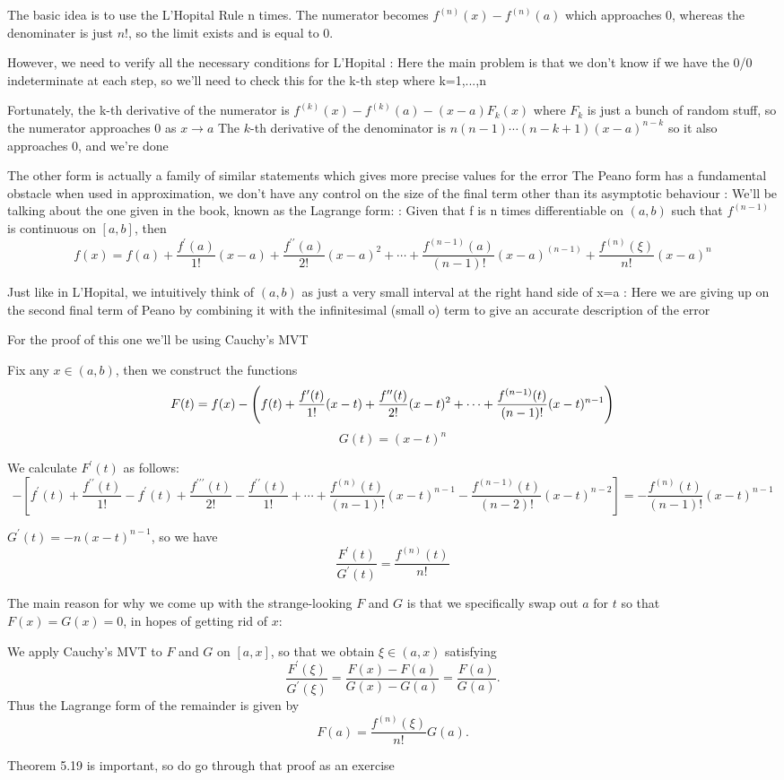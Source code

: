 The basic idea is to use the L'Hopital Rule n times. The numerator becomes $f^{(n)}(x)-f^{(n)}(a)$ which approaches $0$, whereas the denominater is just $n!$, so the limit exists and is equal to $0$.

However, we need to verify all the necessary conditions for L'Hopital
:
Here the main problem is that we don't know if we have the 0/0 indeterminate at each step, so we'll need to check this for the k-th step where k=1,...,n

Fortunately, the k-th derivative of the numerator is
$f^{(k)}(x)-f^{(k)}(a)-(x-a)F_k(x)$ where $F_k$ is just a bunch of random stuff, so the numerator approaches $0$ as $x\to a$
The $k$-th derivative of the denominator is $n(n-1)\cdots(n-k+1)(x-a)^{n-k}$ so it also approaches $0$, and we're done

The other form is actually a family of similar statements which gives more precise values for the error
The Peano form has a fundamental obstacle when used in approximation, we don't have any control on the size of the final term other than its asymptotic behaviour
:
We'll be talking about the one given in the book, known as the Lagrange form:
:
Given that f is n times differentiable on $(a,b)$ such that $f^{(n-1)}$ is continuous on $[a,b]$, then
\[ f(x)=f(a)+\frac{f^\prime(a)}{1!}(x-a)+\frac{f^{\prime\prime}(a)}{2!}(x-a)^2+\cdots+\frac{f^{(n-1)}(a)}{(n-1)!}(x-a)^(n-1)+\frac{f^{(n)}(\xi)}{n!}(x-a)^n \]

Just like in L'Hopital, we intuitively think of $(a,b)$ as just a very small interval at the right hand side of x=a
:
Here we are giving up on the second final term of Peano by combining it with the infinitesimal (small o) term to give an accurate description of the error

For the proof of this one we'll be using Cauchy's MVT

Fix any $x\in(a,b)$, then we construct the functions
\[ F(t)=f(x)-\left(f(t)+\frac{f^\prime(t)}{1!}(x-t)+\frac{f^{\prime\prime}(t)}{2!}(x-t)^2+\cdots+\frac{f^{(n-1)}(t)}{(n-1)!}(x-t)^{n-1}\right) \]
\[ G(t)=(x-t)^n \]

We calculate $F^\prime(t)$ as follows:
\[ -[f^\prime(t)+\frac{f^{\prime\prime}(t)}{1!}-f^\prime(t)+\frac{f^{\prime\prime\prime}(t)}{2!}-\frac{f^{\prime\prime}(t)}{1!}+\cdots+\frac{f^{(n)}(t)}{(n-1)!}(x-t)^{n-1}-\frac{f^{(n-1)}(t)}{(n-2)!}(x-t)^{n-2}]=-\frac{f^{(n)}(t)}{(n-1)!}(x-t)^{n-1} \]

$G^\prime(t)=-n(x-t)^{n-1}$, so we have
\[ \frac{F^\prime(t)}{G^\prime(t)}=\frac{f^{(n)}(t)}{n!} \]

The main reason for why we come up with the strange-looking $F$ and $G$ is that we specifically swap out $a$ for $t$ so that $F(x)=G(x)=0$, in hopes of getting rid of $x$:

We apply Cauchy's MVT to $F$ and $G$ on $[a,x]$, so that we obtain $\xi\in(a,x)$ satisfying
\[ \frac{F^\prime(\xi)}{G^\prime(\xi)}=\frac{F(x)-F(a)}{G(x)-G(a)}=\frac{F(a)}{G(a)}. \]
Thus the Lagrange form of the remainder is given by 
\[ F(a)=\frac{f^{(n)}(\xi)}{n!}G(a). \]

Theorem 5.19 is important, so do go through that proof as an exercise